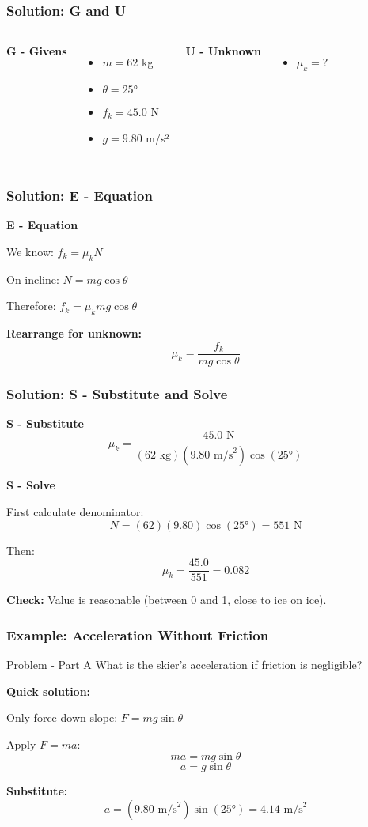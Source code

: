 \documentclass{beamer}
\begin{document}
\begin{frame}
\frametitle{Solution: G and U}
\begin{columns}[T]
\textbf{G - Givens}
\begin{itemize}
    \item $m = 62$ kg
    \item $\theta = 25°$
    \item $f_k = 45.0$ N
    \item $g = 9.80$ m/s²
\end{itemize}

\textbf{U - Unknown}
\begin{itemize}
    \item $\mu_k = ?$
\end{itemize}
\end{columns}
\end{frame}

\begin{frame}
\frametitle{Solution: E - Equation}
\textbf{E - Equation}

We know: $f_k = \mu_k N$

On incline: $N = mg\cos\theta$

Therefore: $f_k = \mu_k mg\cos\theta$

\textbf{Rearrange for unknown:}
\[ \mu_k = \frac{f_k}{mg\cos\theta} \]
\end{frame}

\begin{frame}
\frametitle{Solution: S - Substitute and Solve}
\textbf{S - Substitute}
\[ \mu_k = \frac{45.0\text{ N}}{(62\text{ kg})(9.80\text{ m/s}^2)\cos(25°)} \]

\pause
\textbf{S - Solve}

First calculate denominator:
\[ N = (62)(9.80)\cos(25°) = 551\text{ N} \]

Then:
\[ \mu_k = \frac{45.0}{551} = 0.082 \]

\vspace{0.5em}

\pause
\textbf{Check:} Value is reasonable (between 0 and 1, close to ice on ice).
\end{frame}

\begin{frame}
\frametitle{Example: Acceleration Without Friction}
\begin{block}{Problem - Part A}
What is the skier's acceleration if friction is negligible?
\end{block}

\pause
\textbf{Quick solution:}

Only force down slope: $F = mg\sin\theta$

Apply $F = ma$:
\[ ma = mg\sin\theta \]
\[ a = g\sin\theta \]

\pause
\textbf{Substitute:}
\[ a = (9.80\text{ m/s}^2)\sin(25°) = 4.14\text{ m/s}^2 \]

\end{frame}
\end{document}
